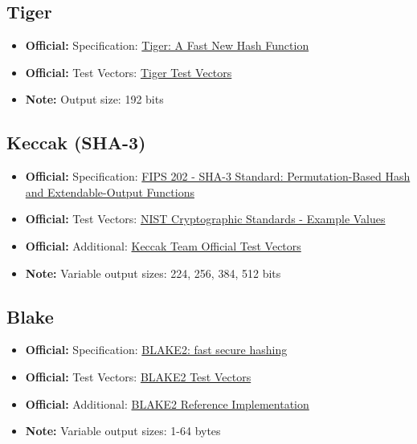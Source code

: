 \documentclass[12pt,a4paper]{article}
\newcommand{\official}[1]{\textcolor{citegreen}{\textbf{Official:}} #1}
\newcommand{\note}[1]{\textcolor{noteorange}{\textbf{Note:}} #1}
\newcommand{\link}[2]{\href{#1}{#2}}
\begin{document}
\subsection{Tiger}
\begin{itemize}
    \item \official{Specification:} \link{https://www.cs.technion.ac.il/~biham/Reports/Tiger/}{Tiger: A Fast New Hash Function}
    \item \official{Test Vectors:} \link{https://www.cs.technion.ac.il/~biham/Reports/Tiger/}{Tiger Test Vectors}
    \item \note{Output size: 192 bits}
\end{itemize}

\subsection{Keccak (SHA-3)}
\begin{itemize}
    \item \official{Specification:} \link{https://nvlpubs.nist.gov/nistpubs/FIPS/NIST.FIPS.202.pdf}{FIPS 202 - SHA-3 Standard: Permutation-Based Hash and Extendable-Output Functions}
    \item \official{Test Vectors:} \link{https://csrc.nist.gov/Projects/cryptographic-standards-and-guidelines/example-values}{NIST Cryptographic Standards - Example Values}
    \item \official{Additional:} \link{https://keccak.team/}{Keccak Team Official Test Vectors}
    \item \note{Variable output sizes: 224, 256, 384, 512 bits}
\end{itemize}

\subsection{Blake}
\begin{itemize}
    \item \official{Specification:} \link{https://blake2.net/}{BLAKE2: fast secure hashing}
    \item \official{Test Vectors:} \link{https://github.com/BLAKE2/BLAKE2/blob/master/testvectors/blake2-kat.json}{BLAKE2 Test Vectors}
    \item \official{Additional:} \link{https://github.com/BLAKE2/BLAKE2}{BLAKE2 Reference Implementation}
    \item \note{Variable output sizes: 1-64 bytes}
\end{itemize}
\end{document}
